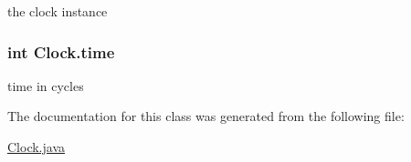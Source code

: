 the clock instance 

\hypertarget{classClock_a41bc3b4f0629b2c79c958603ebc84d2a}{
\subsubsection[{time}]{\setlength{\rightskip}{0pt plus 5cm}int {\bf \-Clock.\-time}}}\label{classClock_a41bc3b4f0629b2c79c958603ebc84d2a}


time in cycles 



\-The documentation for this class was generated from the following file\-:\begin{DoxyCompactItemize}
\item 
\hyperlink{Clock_8java}{\-Clock.\-java}\end{DoxyCompactItemize}
